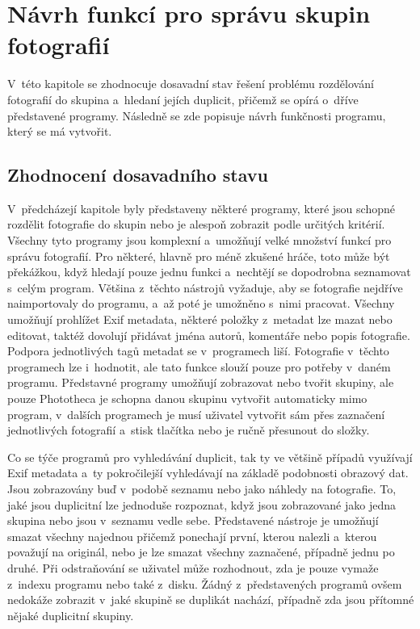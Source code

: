 \chapter{Návrh funkcí pro správu skupin fotografií}
\label{Nvr}

V~této kapitole se zhodnocuje dosavadní stav řešení problému rozdělování fotografií do skupina a~hledaní jejích duplicit, přičemž se opírá o~dříve představené programy. Následně se zde popisuje návrh funkčnosti programu, který se má vytvořit.

\section{Zhodnocení dosavadního stavu}

V~předcházejí kapitole byly představeny některé programy, které jsou schopné rozdělit fotografie do skupin nebo je alespoň zobrazit podle určitých kritérií. Všechny tyto programy jsou komplexní a~umožňují velké množství funkcí pro správu fotografií. Pro některé, hlavně pro méně zkušené hráče, toto může být překážkou, když hledají pouze jednu funkci a~nechtějí se dopodrobna seznamovat s~celým program. Většina z~těchto nástrojů vyžaduje, aby se fotografie nejdříve naimportovaly do programu, a~až poté je umožněno s~nimi pracovat. Všechny umožňují prohlížet Exif metadata, některé položky z~metadat lze mazat nebo editovat, taktéž dovolují přidávat jména autorů, komentáře nebo popis fotografie. Podpora jednotlivých tagů metadat se v~programech liší. Fotografie v~těchto programech lze i~hodnotit, ale tato funkce slouží pouze pro potřeby v~daném programu. Představné programy umožňují zobrazovat nebo tvořit skupiny, ale pouze Phototheca je schopna danou skupinu vytvořit automaticky mimo program, v~dalších programech je musí uživatel vytvořit sám přes zaznačení jednotlivých fotografií a~stisk tlačítka nebo je ručně přesunout do složky.

Co se týče programů pro vyhledávání duplicit, tak ty ve většině případů využívají Exif metadata a~ty pokročilejší vyhledávají na základě podobnosti obrazový dat. Jsou zobrazovány buď v~podobě seznamu nebo jako náhledy na fotografie. To, jaké jsou duplicitní lze jednoduše rozpoznat, když jsou zobrazované jako jedna skupina nebo jsou v~seznamu vedle sebe. Představené nástroje je umožňují smazat všechny najednou přičemž ponechají první, kterou nalezli a~kterou považují na originál, nebo je lze smazat všechny zaznačené, případně jednu po druhé. Při odstraňování se uživatel může rozhodnout, zda je pouze vymaže z~indexu programu nebo také z~disku. Žádný z~představených programů ovšem nedokáže zobrazit v~jaké skupině se duplikát nachází, případně zda jsou přítomné nějaké duplicitní skupiny.

